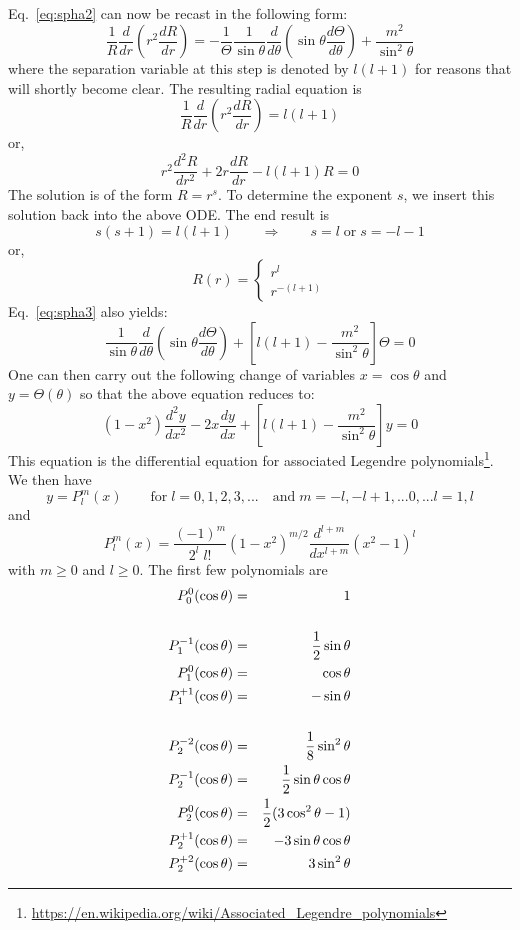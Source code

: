 Eq.~\eqref{eq:spha2} can now be recast in the following form:
\begin{equation}
 \frac{1}{R} \frac{d}{dr} \left( r^2 \frac{dR}{dr} \right) 
= 
-\frac{1}{\Theta}\frac{1}{\sin\theta} \frac{d}{d\theta} \left( \sin \theta \frac{d\Theta}{d\theta} \right) 
+\frac{m^2}{\sin^2\theta} \label{eq:spha3}
\end{equation}
where the separation variable at this step is denoted by $l(l + 1)$ for reasons that will shortly
become clear.
The resulting radial equation is 
\[
\frac{1}{R} \frac{d}{dr} \left( r^2 \frac{dR}{dr} \right)  = l(l+1)
\]
or, 
\[
r^2 \frac{d^2R}{dr^2} + 2 r \frac{dR}{dr} - l(l+1)R =0
\]
The solution is of the form $R=r^s$. To determine the exponent $s$, 
we insert this solution back into the above ODE. The end result is
\[
s(s+1)=l(l+1) \qquad \Rightarrow \qquad s=l \; \text{or} \; s=-l-1
\]
or, 
\[
R(r) = 
\left\{
\begin{array}{c}
r^l \\ r^{-(l+1)}
\end{array}
\right.
\]
Eq.~\eqref{eq:spha3} also yields:
\[
\frac{1}{\sin\theta} \frac{d}{d\theta} \left( \sin\theta \frac{d\Theta}{d\theta} \right) 
+
\left[ l(l+1) - \frac{m^2}{\sin^2\theta} \right] \Theta = 0
\]
One can then carry out the following change of variables $x=\cos\theta$ and $y=\Theta(\theta)$ so that 
the above equation reduces to:
\[
(1-x^2) \frac{d^2 y}{d x^2} - 2x \frac{dy}{dx} + 
\left[ l(l+1)-\frac{m^2}{\sin^2\theta} \right] y =0
\]
This equation is the differential equation for associated Legendre 
polynomials\footnote{\url{https://en.wikipedia.org/wiki/Associated_Legendre_polynomials}}.
We then have
\[
y=P_l^m(x) \qquad \text{for} \; l=0,1,2,3,... \quad \text{and} \; m=-l,-l+1,...0,...l=1,l
\]
and 
\[
\boxed{
P_l^m(x)= \frac{(-1)^m}{2^l \; l!} (1-x^2)^{m/2}
\frac{d^{l+m}}{dx^{l+m}} (x^2-1)^l
}
\]
with $m \geq 0$ and $l\geq 0$.
The first few polynomials are
\begin{eqnarray}
P_0^0(\cos\theta)    &=& 1 \nonumber\\ \nonumber\\ 
P_1^{-1}(\cos\theta) &=& \frac12 \sin\theta \nonumber\\ 
P_1^{0}(\cos\theta)  &=&  \cos\theta \nonumber\\ 
P_1^{+1}(\cos\theta) &=& -\sin\theta \nonumber\\ \nonumber\\
P_2^{-2}(\cos\theta) &=& \frac18 \sin^2\theta \nonumber\\
P_2^{-1}(\cos\theta) &=& \frac12\sin\theta\cos\theta \nonumber\\
P_2^{0}(\cos\theta)  &=& \frac12(3\cos^2\theta -1) \nonumber\\
P_2^{+1}(\cos\theta) &=& -3 \sin\theta\cos\theta \nonumber\\
P_2^{+2}(\cos\theta) &=& 3\sin^2\theta \nonumber
\end{eqnarray}





